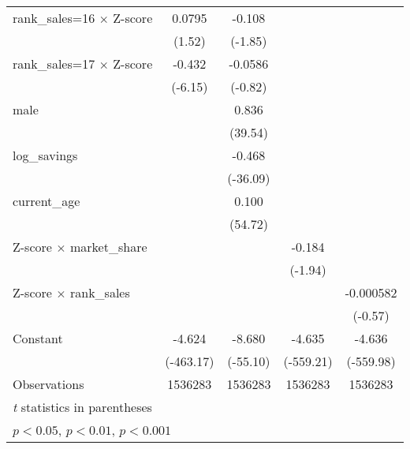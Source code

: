 {\begin{tabular}{l*{4}{c}}
rank\_sales=16 $\times$ Z-score&      0.0795         &      -0.108         &                     &                     \\
                    &      (1.52)         &     (-1.85)         &                     &                     \\
rank\_sales=17 $\times$ Z-score&      -0.432\sym{***}&     -0.0586         &                     &                     \\
                    &     (-6.15)         &     (-0.82)         &                     &                     \\
male                &                     &       0.836\sym{***}&                     &                     \\
                    &                     &     (39.54)         &                     &                     \\
log\_savings         &                     &      -0.468\sym{***}&                     &                     \\
                    &                     &    (-36.09)         &                     &                     \\
current\_age         &                     &       0.100\sym{***}&                     &                     \\
                    &                     &     (54.72)         &                     &                     \\
Z-score $\times$ market\_share&                     &                     &      -0.184         &                     \\
                    &                     &                     &     (-1.94)         &                     \\
Z-score $\times$ rank\_sales&                     &                     &                     &   -0.000582         \\
                    &                     &                     &                     &     (-0.57)         \\
Constant            &      -4.624\sym{***}&      -8.680\sym{***}&      -4.635\sym{***}&      -4.636\sym{***}\\
                    &   (-463.17)         &    (-55.10)         &   (-559.21)         &   (-559.98)         \\
\hline
Observations        &     1536283         &     1536283         &     1536283         &     1536283         \\
\hline\hline
\multicolumn{5}{l}{\footnotesize \textit{t} statistics in parentheses}\\
\multicolumn{5}{l}{\footnotesize \sym{*} \(p<0.05\), \sym{**} \(p<0.01\), \sym{***} \(p<0.001\)}\\
\end{tabular}
}
